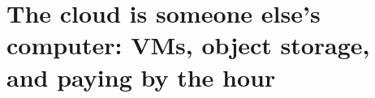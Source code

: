 \chapter{The cloud is someone else's computer: VMs, object storage, and paying by the hour}
\label{ch:the-cloud-is-someone-else-s-computer}

